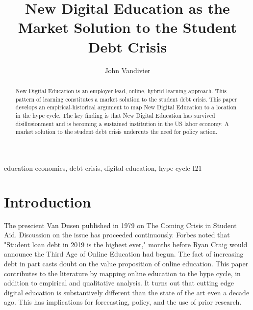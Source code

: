 \documentclass[review]{elsarticle}
\begin{document}
\begin{frontmatter}

\title{
    New Digital Education as the Market Solution to the Student Debt Crisis
}


\author[mymainaddress]{John Vandivier}
\address[mymainaddress]{4400 University Dr, Fairfax, VA 22030}

\begin{abstract}
    New Digital Education is an employer-lead, online, hybrid learning approach.
    This pattern of learning constitutes a market solution to the student debt crisis.
    This paper develops an empirical-historical argument to map New Digital Education
    to a location in the hype cycle. The key finding is that New Digital Education
    has survived disillusionment and is becoming a sustained institution in the US labor economy.
    A market solution to the student debt crisis undercuts the need for policy action.
\end{abstract}

\begin{keyword}
education economics, debt crisis, digital education, hype cycle
\MSC[2010] I21 %
\end{keyword}

\end{frontmatter}

\pagebreak
\linenumbers
        
    \section{Introduction}

    The prescient Van Dusen published in 1979 on The Coming Crisis in Student Aid\cite{van1979coming}.
    Discussion on the issue has proceeded continuously.
    Forbes\cite{friedman2019student} noted that "Student loan debt in 2019 is the highest ever,"
    months before Ryan Craig would announce the Third Age of Online Education had begun\cite{craig2019welcome}.
    The fact of increasing debt in part casts doubt on the value proposition of online education.
    This paper contributes to the literature by mapping online education to the hype cycle, in addition to empirical and qualitative analysis.
    It turns out that cutting edge digital education is substantively different than the state of the art even a decade ago.
    This has implications for forecasting, policy, and the use of prior research.
\end{document}
